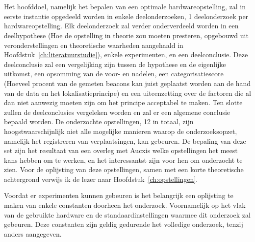 
\chapter{}
\label{ch:methodologie}


Het hoofddoel, namelijk het bepalen van een optimale hardwareopstelling, zal in eerste instantie opgedeeld worden in enkele deelonderzoeken, 1 deelonderzoek per hardwareopstelling. Elk deelonderzoek zal verder onderverdeeld worden in een deelhypothese (Hoe de opstelling in theorie zou moeten presteren, opgebouwd uit veronderstellingen en theoretische waarheden aangehaald in Hoofdstuk~\ref{ch:literatuurstudie}), enkele experimenten, en een deelconclusie. Deze deelconclusie zal een vergelijking zijn tussen de hypothese en de eigenlijke uitkomst, een opsomming van de voor- en nadelen, een categorisatiescore (Hoeveel procent van de gemeten beacons kan juist geplaatst worden aan de hand van de data en het lokalisatieprincipe) en een uiteenzetting over de factoren die al dan niet aanwezig moeten zijn om het principe acceptabel te maken. Ten slotte zullen de deelconclusies vergeleken worden en zal er een algemene conclusie bepaald worden. De onderzochte opstellingen, 12 in totaal, zijn hoogstwaarschijnlijk niet alle mogelijke manieren waarop de onderzoeksopzet, namelijk het registreren van verplaatsingen, kan gebeuren. De bepaling van deze set zijn het resultaat van een overleg met Aucxis welke opstellingen het meest kans hebben om te werken, en het interessantst zijn voor hen om onderzocht te zien. Voor de oplijsting van deze opstellingen, samen met een korte theoretische achtergrond verwijs ik de lezer naar Hoofdstuk~\ref{ch:opstellingen}.

Voordat er experimenten kunnen gebeuren is het belangrijk een oplijsting te maken van enkele constanten doorheen het onderzoek. Voornamelijk op het vlak van de gebruikte hardware en de standaardinstellingen waarmee dit onderzoek zal gebeuren. Deze constanten zijn geldig gedurende het volledige onderzoek, tenzij anders aangegeven.

